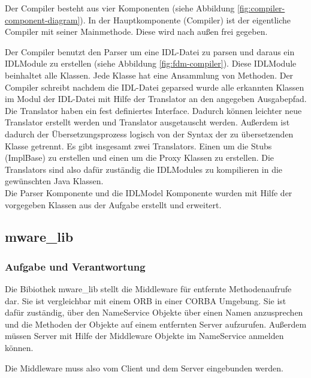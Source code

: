 \documentclass{article}
\begin{document}
Der Compiler besteht aus vier Komponenten (siehe Abbildung \ref{fig:compiler-component-diagram}). In der
Hauptkomponente (Compiler) ist der eigentliche Compiler mit seiner Mainmethode. Diese wird nach außen frei gegeben.

Der Compiler benutzt den Parser um eine IDL-Datei zu parsen und daraus ein IDLModule zu erstellen (siehe Abbildung
\ref{fig:fdm-compiler}). Diese IDLModule beinhaltet alle Klassen. Jede Klasse hat eine Ansammlung von Methoden.
Der Compiler schreibt nachdem die IDL-Datei geparsed wurde alle erkannten Klassen im Modul der IDL-Datei mit Hilfe der
Translator an den angegeben Ausgabepfad.\\

Die Translator haben ein fest definiertes Interface. Dadurch können leichter neue Translator erstellt werden und
Translator ausgetauscht werden. Außerdem ist dadurch der Übersetzungsprozess logisch von der Syntax der zu übersetzenden
Klasse getrennt.
Es gibt insgesamt zwei Translators. Einen um die Stubs (ImplBase) zu erstellen und einen
um die Proxy Klassen zu erstellen. Die Translators sind also dafür zuständig die IDLModules zu kompilieren in die
gewünschten Java Klassen.\\

Die Parser Komponente und die IDLModel Komponente wurden mit Hilfe der vorgegeben Klassen aus der Aufgabe erstellt und
erweitert.

\subsection{mware\_lib}
\subsubsection{Aufgabe und Verantwortung}
Die Bibiothek mware\_lib stellt die Middleware für entfernte Methodenaufrufe dar. Sie ist vergleichbar mit einem ORB in
einer CORBA Umgebung. Sie ist dafür zuständig, über den NameService Objekte über einen Namen anzusprechen und die
Methoden der Objekte auf einem entfernten Server aufzurufen. Außerdem müssen Server mit Hilfe der Middleware Objekte im
NameService anmelden können.

Die Middleware muss also vom Client und dem Server eingebunden werden.
\end{document}
